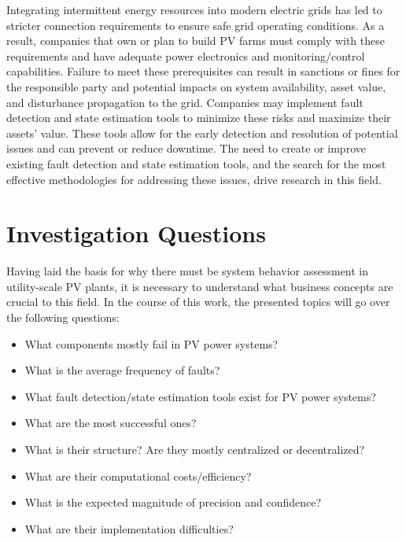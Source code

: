 Integrating intermittent energy resources into modern electric grids has led to stricter connection requirements to ensure safe grid operating conditions. As a result, companies that own or plan to build PV farms must comply with these requirements and have adequate power electronics and monitoring/control capabilities. Failure to meet these prerequisites can result in sanctions or fines for the responsible party and potential impacts on system availability, asset value, and disturbance propagation to the grid. Companies may implement fault detection and state estimation tools to minimize these risks and maximize their assets' value. These tools allow for the early detection and resolution of potential issues and can prevent or reduce downtime. The need to create or improve existing fault detection and state estimation tools, and the search for the most effective methodologies for addressing these issues, drive research in this field.

\section{Investigation Questions}

Having laid the basis for why there must be system behavior assessment in utility-scale PV plants, it is necessary to understand what business concepts are crucial to this field. In the course of this work, the presented topics will go over the following questions:

\begin{itemize}
    \item What components mostly fail in PV power systems?
    \item What is the average frequency of faults?
    \item What fault detection/state estimation tools exist for PV
    power systems?
    \item What are the most successful ones?
    \item What is their structure? Are they mostly centralized or decentralized?
    \item What are their computational costs/efficiency?
    \item What is the expected magnitude of precision and confidence?
    \item What are their implementation difficulties?
\end{itemize}


